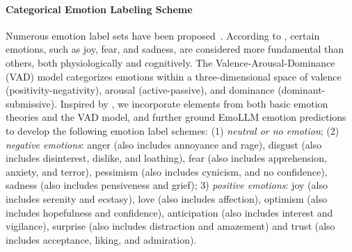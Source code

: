 \paragraph{Categorical Emotion Labeling Scheme} \label{para:emotion_label}
Numerous emotion label sets  have been proposed~\citep{Ekman1992AnAF, Plutchik1980AGP, Russell1980ACM}. According to \citet{Ekman1992AnAF, Plutchik1980AGP}, certain emotions, such as joy, fear, and sadness, are considered more fundamental than others, both physiologically and cognitively. The Valence-Arousal-Dominance (VAD) model \citep{Russell1980ACM} categorizes emotions within a three-dimensional space of valence (positivity-negativity), arousal (active-passive), and dominance (dominant-submissive). Inspired by \citet{mohammad-etal-2018-semeval}, we incorporate elements from both basic emotion theories and the VAD model, and further ground EmoLLM emotion predictions to develop the following emotion label schemes: (1) \textit{neutral or no emotion}; (2) \textit{negative emotions}: anger (also includes annoyance and rage),  disgust (also includes disinterest, dislike, and loathing), fear (also includes apprehension, anxiety, and terror), pessimism (also includes cynicism, and no confidence), sadness (also includes pensiveness and grief); 3) \textit{positive emotions}: joy (also includes serenity and ecstasy), love (also includes affection), optimism (also includes hopefulness and confidence), anticipation (also includes interest and vigilance), surprise (also includes distraction and amazement) and trust (also includes acceptance, liking, and admiration). 


